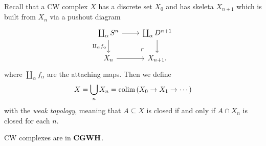 \documentclass{article}[11pt]
\begin{document}
\begin{example} Recall that a CW complex $X$ has a discrete set $X_0$ and has skeleta $X_{n+1}$ which is built from $X_n$ via a pushout diagram
\[
	\begin{tikzcd}
	\coprod_\alpha S^n \dar["\amalg_\alpha f_\alpha" left]\rar & \coprod_\alpha D^{n+1}\dar \\
	X_n\rar & X_{n+1} \po.
	\end{tikzcd}
\]
where $\amalg_\alpha f_\alpha$ are the attaching maps. Then we define
\begin{align*}
	X = \bigcup_n X_n = \mathop{\operatorname*{colim}} \left( X_0 \to X_1 \to \cdots \right)
\end{align*}
with the \textit{weak topology}, meaning that $A\subseteq X$ is closed if and only if $A\cap X_n$ is closed for each $n$.
\end{example}


\begin{proposition} CW complexes are in $\textbf{CGWH}$.
\end{proposition}
\end{document}
